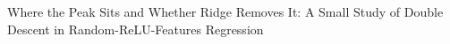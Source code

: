 Where the Peak Sits and Whether Ridge Removes It: A Small Study of Double Descent in Random-ReLU-Features Regression
